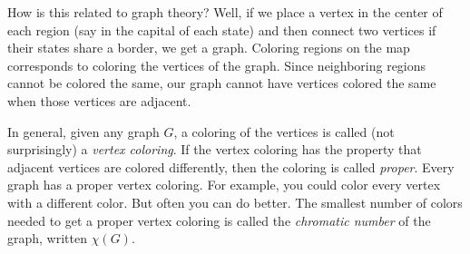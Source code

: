 \documentclass[10pt,]{book}
\theoremstyle{plain}
\theoremstyle{definition}
\theoremstyle{definition}
\theoremstyle{definition}
\numberwithin{equation}{chapter}
\begin{document}
How is this related to graph theory? Well, if we place a vertex in the center of each region (say in the capital of each state) and then connect two vertices if their states share a border, we get a graph. Coloring regions on the map corresponds to coloring the vertices of the graph. Since neighboring regions cannot be colored the same, our graph cannot have vertices colored the same when those vertices are adjacent.
%
\par

In general, given any graph \(G\), a coloring of the vertices is called (not surprisingly) a \emph{vertex coloring}. If the vertex coloring has the property that adjacent vertices are colored differently, then the coloring is called \emph{proper}. Every graph has a proper vertex coloring. For example, you could color every vertex with a different color. But often you can do better. The smallest number of colors needed to get a proper vertex coloring is called the \emph{chromatic number} of the graph, written \(\chi(G)\).
%
\end{document}

